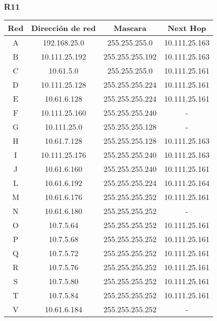 \subsubsection{R11}
\begin{table}[!htbp]
\centering
  \begin{tabular}{|c|c|c|c|}
  \hline
Red & Dirección de red & Mascara & Next Hop\\ \hline
A & 192.168.25.0 & 255.255.255.0 & 10.111.25.163 \\ \hline
B & 10.111.25.192 & 255.255.255.192 & 10.111.25.163 \\ \hline
C & 10.61.5.0 & 255.255.255.0 & 10.111.25.161 \\ \hline
D & 10.111.25.128 & 255.255.255.224 & 10.111.25.161 \\ \hline
E & 10.61.6.128 & 255.255.255.224 & 10.111.25.161 \\ \hline
F & 10.111.25.160 & 255.255.255.240 & -\\ \hline
G & 10.111.25.0 & 255.255.255.128 & -\\ \hline
H & 10.61.7.128 & 255.255.255.128 & 10.111.25.163 \\ \hline
I & 10.111.25.176 & 255.255.255.240 & 10.111.25.163 \\ \hline
J & 10.61.6.160 & 255.255.255.240 & 10.111.25.161 \\ \hline
L & 10.61.6.192 & 255.255.255.224 & 10.111.25.164 \\ \hline
M & 10.61.6.176 & 255.255.255.252 & 10.111.25.161 \\ \hline
N & 10.61.6.180 & 255.255.255.252 & -\\ \hline
O & 10.7.5.64 & 255.255.255.252 & 10.111.25.161 \\ \hline
P & 10.7.5.68 & 255.255.255.252 & 10.111.25.161 \\ \hline
Q & 10.7.5.72 & 255.255.255.252 & 10.111.25.161 \\ \hline
R & 10.7.5.76 & 255.255.255.252 & 10.111.25.161 \\ \hline
S & 10.7.5.80 & 255.255.255.252 & 10.111.25.161 \\ \hline
T & 10.7.5.84 & 255.255.255.252 & 10.111.25.161 \\ \hline
V & 10.61.6.184 & 255.255.255.252 & -\\
  \hline
 \end{tabular}
\end{table}

\newpage
